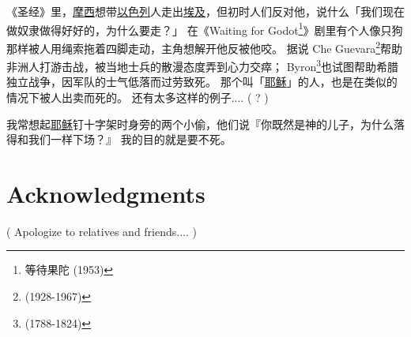 \documentclass[12pt]{report}
\begin{document}
《圣经》里，\underline{摩西}想带\underline{以色列}人走出\underline{埃及}，但初时人们反对他，说什么「我们现在做奴隶做得好好的，为什么要走？」 在《Waiting for Godot\footnote{等待果陀 (1953)}》剧里有个人像只狗那样被人用绳索拖着四脚走动，主角想解开他反被他咬。 据说 Che Guevara\footnote{(1928-1967)}帮助非洲人打游击战，被当地士兵的散漫态度弄到心力交瘁； Byron\footnote{(1788-1824)}也试图帮助希腊独立战争，因军队的士气低落而过劳致死。 那个叫「\underline{耶稣}」的人，也是在类似的情况下被人出卖而死的。 还有太多这样的例子.... ( ? )

我常想起\underline{耶稣}钉十字架时身旁的两个小偷，他们说『你既然是神的儿子，为什么落得和我们一样下场？』 我的目的就是要不死。


\chapter*{Acknowledgments}

( Apologize to relatives and friends.... )

%

\onecolumn

\end{document}
